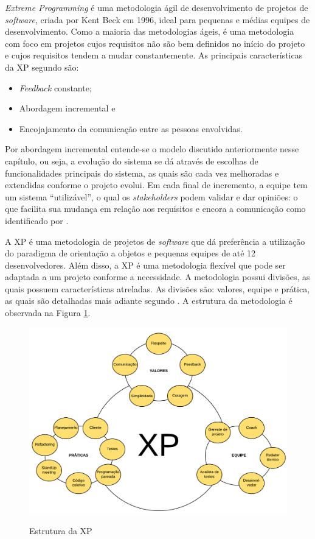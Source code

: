 \textit{Extreme Programming} é uma metodologia ágil de desenvolvimento de projetos de \textit{software}, criada por Kent Beck em 1996, ideal para pequenas e médias equipes de desenvolvimento. Como a maioria das metodologias ágeis, é uma metodologia com foco em projetos cujos requisitos não são bem definidos no início do projeto e cujos requisitos tendem a mudar constantemente. As principais características da XP segundo  são: 

\begin{itemize}
	\item \textit{Feedback} constante;
	\item Abordagem incremental e
	\item Encojajamento da comunicação entre as pessoas envolvidas.
\end{itemize}

Por abordagem incremental entende-se o modelo discutido anteriormente nesse capítulo, ou seja, a evolução do sistema se dá através de escolhas de funcionalidades principais do sistema, as quais são cada vez melhoradas e extendidas conforme o projeto evolui. Em cada final de incremento, a equipe tem um sistema ``utilizável'', o qual os \textit{stakeholders} podem validar e dar opiniões: o que facilita sua mudança em relação aos requisitos e encora a comunicação como identificado por .

A XP é uma metodologia de projetos de \textit{software} que dá preferência a utilização do paradigma de orientação a objetos e pequenas equipes de até 12 desenvolvedores. Além disso, a XP é uma metodologia flexível que pode ser adaptada a um projeto conforme a necessidade. A metodologia possui divisões, as quais possuem características atreladas. As divisões são: valores, equipe e prática, as quais são detalhadas mais adiante segundo . A estrutura da metodologia é observada na Figura \ref{fig:10}.

\begin{figure}[htb!]
\begin{center}
\caption{Estrutura da XP}
\label{fig:10}
\includegraphics[width=14cm]{assets/xp} \\
\end{center}
\end{figure}

